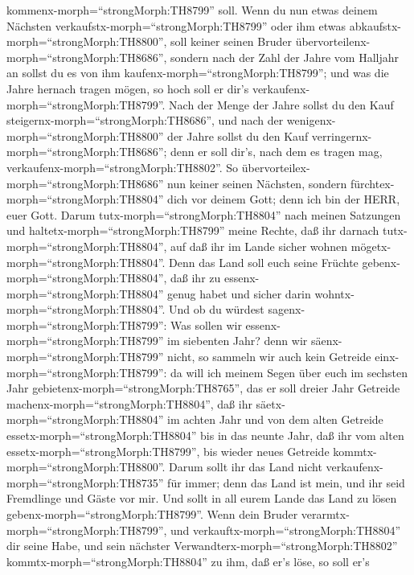 kommenx-morph=``strongMorph:TH8799'' soll.  Wenn du nun
etwas deinem Nächsten verkaufstx-morph=``strongMorph:TH8799'' oder ihm
etwas abkaufstx-morph=``strongMorph:TH8800'', soll keiner seinen Bruder
übervorteilenx-morph=``strongMorph:TH8686'',  sondern nach
der Zahl der Jahre vom Halljahr an sollst du es von ihm
kaufenx-morph=``strongMorph:TH8799''; und was die Jahre hernach tragen
mögen, so hoch soll er dir's verkaufenx-morph=``strongMorph:TH8799''.
 Nach der Menge der Jahre sollst du den Kauf
steigernx-morph=``strongMorph:TH8686'', und nach der
wenigenx-morph=``strongMorph:TH8800'' der Jahre sollst du den Kauf
verringernx-morph=``strongMorph:TH8686''; denn er soll dir's, nach dem
es tragen mag, verkaufenx-morph=``strongMorph:TH8802''.  So
übervorteilex-morph=``strongMorph:TH8686'' nun keiner seinen Nächsten,
sondern fürchtex-morph=``strongMorph:TH8804'' dich vor deinem Gott; denn
ich bin der HERR, euer Gott.  Darum
tutx-morph=``strongMorph:TH8804'' nach meinen Satzungen und
haltetx-morph=``strongMorph:TH8799'' meine Rechte, daß ihr darnach
tutx-morph=``strongMorph:TH8804'', auf daß ihr im Lande sicher wohnen
mögetx-morph=``strongMorph:TH8804''.  Denn das Land soll
euch seine Früchte gebenx-morph=``strongMorph:TH8804'', daß ihr zu
essenx-morph=``strongMorph:TH8804'' genug habet und sicher darin
wohntx-morph=``strongMorph:TH8804''.  Und ob du würdest
sagenx-morph=``strongMorph:TH8799'': Was sollen wir
essenx-morph=``strongMorph:TH8799'' im siebenten Jahr? denn wir
säenx-morph=``strongMorph:TH8799'' nicht, so sammeln wir auch kein
Getreide einx-morph=``strongMorph:TH8799'':  da will ich
meinem Segen über euch im sechsten Jahr
gebietenx-morph=``strongMorph:TH8765'', das er soll dreier Jahr Getreide
machenx-morph=``strongMorph:TH8804'',  daß ihr
säetx-morph=``strongMorph:TH8804'' im achten Jahr und von dem alten
Getreide essetx-morph=``strongMorph:TH8804'' bis in das neunte Jahr, daß
ihr vom alten essetx-morph=``strongMorph:TH8799'', bis wieder neues
Getreide kommtx-morph=``strongMorph:TH8800''.  Darum sollt
ihr das Land nicht verkaufenx-morph=``strongMorph:TH8735'' für immer;
denn das Land ist mein, und ihr seid Fremdlinge und Gäste vor mir.
 Und sollt in all eurem Lande das Land zu lösen
gebenx-morph=``strongMorph:TH8799''.  Wenn dein Bruder
verarmtx-morph=``strongMorph:TH8799'', und
verkauftx-morph=``strongMorph:TH8804'' dir seine Habe, und sein nächster
Verwandterx-morph=``strongMorph:TH8802''
kommtx-morph=``strongMorph:TH8804'' zu ihm, daß er's löse, so soll er's
